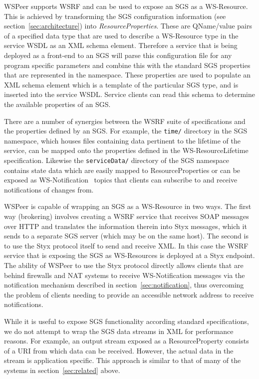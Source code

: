 \documentclass[a4paper]{article}
\begin{document}
WSPeer supports WSRF and can be used to expose an SGS as a WS-Resource. This is achieved by transforming the SGS configuration information (see section~\ref{sec:architecture}) into \textit{ResourceProperties\/}. These are QName/value pairs of a specified data type that are used to describe a WS-Resource type in the service WSDL as an XML schema element. Therefore a service that is being deployed as a front-end to an SGS will parse this configuration file for any program specific parameters and combine this with the standard SGS properties that are represented in the namespace. These properties are used to populate an XML schema element which is a template of the particular SGS type, and is inserted into the service WSDL. Service clients can read this schema to determine the available properties of an SGS.

There are a number of synergies between the WSRF suite of specifications and the properties defined by an SGS. For example, the \texttt{time/} directory in the SGS namespace, which houses files containing data pertinent to the lifetime of the service, can be mapped onto the properties defined in the WS-ResourceLifetime~\cite{wsrf-lifetime} specification. Likewise the \texttt{serviceData/} directory of the SGS namespace contains state data which are easily mapped to ResourceProperties or can be exposed as WS-Notification~\cite{wsrf-notification} topics that clients can subscribe to and receive notifications of changes from.

WSPeer is capable of wrapping an SGS as a WS-Resource in two ways.  The first way (brokering) involves creating a WSRF service that receives SOAP messages over HTTP and translates the information therein into Styx messages, which it sends to a separate SGS server (which may be on the same host). The second is to use the Styx protocol itself to send and receive XML. In this case the WSRF service that is exposing the SGS as WS-Resources is deployed at a Styx endpoint. The ability of WSPeer to use the Styx protocol directly allows clients that are behind firewalls and NAT systems to receive WS-Notification messages via the notification mechanism described in section~\ref{sec:notification}, thus overcoming the problem of clients needing to provide an accessible network address to receive notifications.

While it is useful to expose SGS functionality according standard specifications, we do not attempt to wrap the SGS data streams in XML for performance reasons. For example, an output stream exposed as a ResourceProperty consists of a URI from which data can be received. However, the actual data in the stream is application specific.  This approach is similar to that of many of the systems in section~\ref{sec:related} above.
\end{document}
